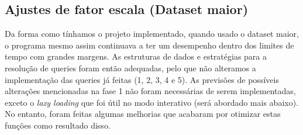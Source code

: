 \documentclass{article}
\begin{document}
        \subsection{Ajustes de fator escala (Dataset maior)}
            Da forma como tínhamos o projeto implementado, quando 
            usado o dataset maior, o programa mesmo assim continuava
            a ter um desempenho dentro dos limites de tempo com grandes 
            margens. As estruturas de dados e estratégias para
            a resolução de queries foram então adequadas, pelo que
            não alteramos a implementação das queries já feitas
            (1, 2, 3, 4 e 5). As previsões de possíveis alterações
            mencionadas na fase 1 não foram necessárias de serem
            implementadas, exceto o \emph{lazy loading} que foi
            útil no modo interativo (será abordado mais abaixo).
            No entanto, foram feitas algumas melhorias que acabaram
            por otimizar estas funções como resultado disso.
\end{document}
